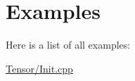 \section{Examples}
Here is a list of all examples\+:\begin{DoxyCompactItemize}
\item 
\hyperlink{Tensor_2Init_8cpp-example}{Tensor/\+Init.\+cpp}
\end{DoxyCompactItemize}
